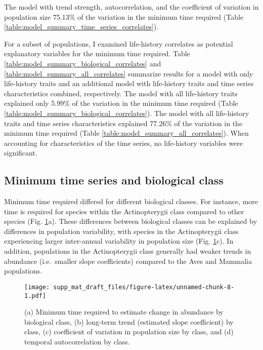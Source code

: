 \documentclass[12pt,]{article}
\begin{document}
The model with trend strength, autocorrelation, and the coefficient of
variation in population size 75.13\% of the variation in the minimum
time required (Table \ref{table:model_summary_time_series_correlates}).

For a subset of populations, I examined life-history correlates as
potential explanatory variables for the minimum time required. Table
\ref{table:model_summary_biological_correlates} and
\ref{table:model_summary_all_correlates} summarize results for a model
with only life-history traits and an additional model with life-history
traits and time series characteristics combined, respectively. The model
with all life-history traits explained only 5.99\% of the variation in
the minimum time required (Table
\ref{table:model_summary_biological_correlates}). The model with all
life-history traits and time series characteristics explained 77.26\% of
the variation in the minimum time required (Table
\ref{table:model_summary_all_correlates}). When accounting for
characteristics of the time series, no life-history variables were
significant.

\pagebreak 

\pagebreak

\subsection{Minimum time series and biological
class}\label{minimum-time-series-and-biological-class}

Minimum time required differed for different biological classes. For
instance, more time is required for species within the Actinopterygii
class compared to other species (Fig. \ref{fig:class}a). These
differences between biological classes can be explained by differences
in population variability, with species in the Actinopterygii class
experiencing larger inter-annual variability in population size (Fig.
\ref{fig:class}c). In addition, populations in the Actinopterygii class
generally had weaker trends in abundance (i.e.~smaller slope
coefficients) compared to the Aves and Mammalia populations.

\begin{figure}
\centering
\texttt{[image: supp\_mat\_draft\_files/figure-latex/unnamed-chunk-8-1.pdf]}
\caption{(a) Minimum time required to estimate change in abundance by
biological class, (b) long-term trend (estimated slope coefficient) by
class, (c) coefficient of variation in population size by class, and (d)
temporal autocorrelation by class.\label{fig:class}}
\end{figure}
\end{document}
